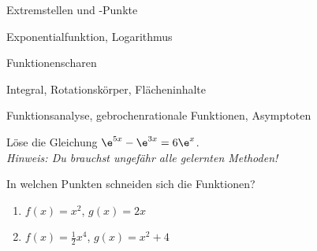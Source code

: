 


\begin{inhalt}
	\item Extremstellen und -Punkte
	\item Exponentialfunktion, Logarithmus
	\item Funktionenscharen
  \item Integral, Rotationskörper, Flächeninhalte
	\item Funktionsanalyse, gebrochenrationale Funktionen, Asymptoten
\end{inhalt}


Löse die Gleichung $\e^{5x}-\e^{3x}=6\e^x$.\\
\textit{Hinweis: Du brauchst ungefähr alle gelernten Methoden!}

 In welchen Punkten schneiden sich die Funktionen?
\begin{multicols}{3}
  \begin{enumerate}
    \item $f(x) = x^2$, $g(x) = 2x$
    \item $f(x) = \frac 1 2 x^4$, $g(x) = x^2+4$
  \end{enumerate}
\end{multicols}


